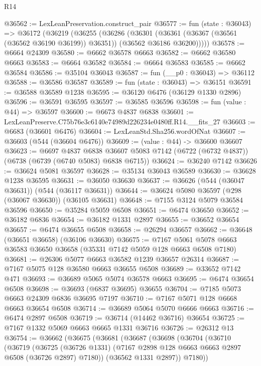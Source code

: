 \begin{lexlean}{R14}
\begin{coremodule}
@36562 := LexLeanPreservation.construct_pair
@36577 := fun (state : @36043) =>
  @36172
    (@36219
      (@36255
        (@36286
          (@36301
            (@36361 (@36367 (@36561 (@36562 @36190 @36199)) @36351))
            (@36562 @36186 @36200)))))
@36578 := @6664 @24309
@36580 := @6662 @36578 @6663
@36582 := @6662 @36580 @6663
@36583 := @6664 @36582
@36584 := @6664 @36583
@36585 := @6662 @36584
@36586 := @35104 @36043
@36587 := fun (__p0 : @36043) => @36112
@36588 := @36586 @36587
@36589 := fun (state : @36043) => @36151
@36591 := @36588 @36589 @1238
@36595 := @36120 @6476 (@36129 @1330 @2896)
@36596 := @36591 @36595
@36597 := @36585 @36596
@36598 := fun (value : @44) => @36597
@36600 := @6673 @4837 @6838
@36601 := LexLeanPreserve.C75b76e3c6140e74989d226234e0480ff.R14.__fits_27
@36603 := @6683 (@36601 @6476)
@36604 := LexLeanStd.Sha256.wordOfNat
@36607 := @36603 (@544 (@36604 @6476))
@36609 := (value : @44) -> @36600 @36607
@36623 := @6697
    @4837
    @6838
    @36607
    @5083
    @7142
    (@6722 (@6732 @4837))
    (@6738 (@6739 (@6740 @5083) @6838 @6715))
@36624 := @36240 @7142
@36626 := @36624 @5081 @36597
@36628 := @35134 @36043 @36589
@36630 := @36628 @1238 @36595
@36631 := @36050 @36630
@36637 := @36626 (@544 (@36047 @36631)) (@544 (@36117 @36631))
@36644 := @36624 @5080 @36597 (@298 (@36067 @36630)) (@36105 @36631)
@36648 := @7155 @3124 @5079 @36584 @36596
@36650 := @35284 @5059 @6508
@36651 := @6474 @36650
@36652 := @36182 @6836
@36654 := @36182 @1331 @2897
@36655 := @36652 @36654
@36657 := @6474 @36655 @6508
@36658 := @26294 @36657
@36662 := @36648 (@36651 @36658) (@36106 @36630)
@36675 := @7167 @5061 @5078 @6663 @36583 @36650 @36658 (@35331 @7142 @5059 @128 @6663 @6508 @7180)
@36681 := @26306 @5077 @6663 @36582 @1239 @36657 @26314
@36687 := @7167 @5075 @128 @36580 @6663 @36655 @6508
@36689 := @33652 @7142 @471
@36693 := @36689 @5065 @5074 @36578 @6663
@36695 := @6474 @36654 @6508
@36698 := @36693 (@6837 @36695) @36655
@36704 := @7185 @5073 @6663 @24309 @6836 @36695 @7197
@36710 := @7167 @5071 @128 @6668 @6663 @36654 @6508
@36714 := @36689 @5064 @5070 @6666 @6663
@36716 := @6474 @2897 @6508
@36719 := @36714 (@14462 @36716) @36654
@36725 := @7167 @1332 @5069 @6663 @6665 @1331 @36716
@36726 := @26312 @13
@36754 := @36662
    (@36675
      (@36681
        (@36687
          (@36698
            (@36704
              (@36710
                (@36719
                  (@36725
                    (@36726 @1331)
                    (@7167 @2898 @128 @6663 @6663 @2897 @6508 (@36726 @2897) @7180))
                  (@36562 @1331 @2897))
                @7180))

\end{coremodule}
\end{lexlean}
